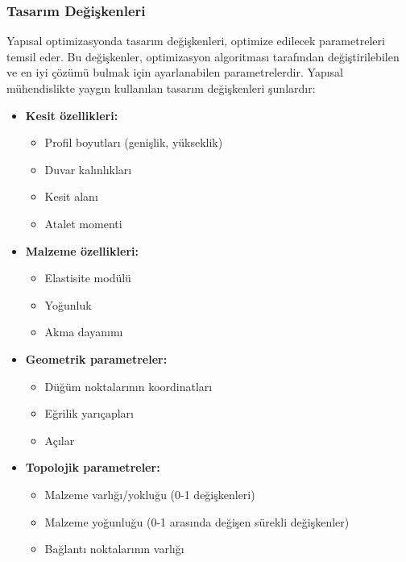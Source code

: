 
\subsubsection{Tasarım Değişkenleri}
Yapısal optimizasyonda tasarım değişkenleri, optimize edilecek parametreleri temsil eder. Bu değişkenler, optimizasyon algoritması tarafından değiştirilebilen ve en iyi çözümü bulmak için ayarlanabilen parametrelerdir. Yapısal mühendislikte yaygın kullanılan tasarım değişkenleri şunlardır:

\begin{itemize}
    \item \textbf{Kesit özellikleri:} 
    \begin{itemize}
        \item Profil boyutları (genişlik, yükseklik)
        \item Duvar kalınlıkları
        \item Kesit alanı
        \item Atalet momenti
    \end{itemize}
    
    \item \textbf{Malzeme özellikleri:} 
    \begin{itemize}
        \item Elastisite modülü
        \item Yoğunluk
        \item Akma dayanımı
    \end{itemize}
    
    \item \textbf{Geometrik parametreler:} 
    \begin{itemize}
        \item Düğüm noktalarının koordinatları
        \item Eğrilik yarıçapları
        \item Açılar
    \end{itemize}
    
    \item \textbf{Topolojik parametreler:} 
    \begin{itemize}
        \item Malzeme varlığı/yokluğu (0-1 değişkenleri)
        \item Malzeme yoğunluğu (0-1 arasında değişen sürekli değişkenler)
        \item Bağlantı noktalarının varlığı
    \end{itemize}
\end{itemize}

